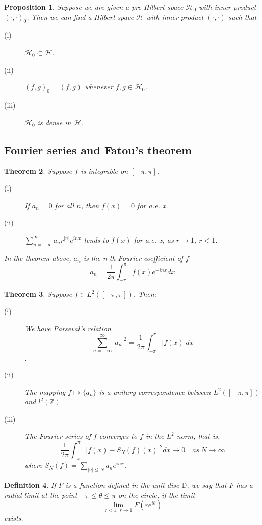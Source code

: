 \documentclass[11pt]{article}
\newtheorem{theorem}{Theorem}[subsection]
\newtheorem{definition}[theorem]{Definition}
\newtheorem{proposition}[theorem]{Proposition}
\begin{document}
\begin{proposition}
    Suppose we are given a pre-Hilbert space $\mathcal{H}_0$ with inner product $(\cdot,\cdot)_0$. Then we can find a Hilbert space $\mathcal{H}$ with inner product $(\cdot,\cdot)$ such that
    \begin{description}
        \item[(i)] $\mathcal{H}_0\subset \mathcal{H}$.
        \item[(ii)] $(f,g)_0=(f,g)$ whenever $f,g\in\mathcal{H}_0$.
        \item[(iii)] $\mathcal{H}_0 $ is dense in $\mathcal{H}$.
    \end{description}
\end{proposition}

\subsection{Fourier series and Fatou's theorem}
\begin{theorem}
    Suppose $f$ is integrable on $[-\pi,\pi]$.
    \begin{description}
        \item[(i)] If $a_n=0$ for all $n$, then $f(x)=0$ for a.e. x.
        \item[(ii)] $\sum_{n=-\infty}^\infty a_nr^{|n|}e^{inx}$ tends to $f(x)$ for a.e. x, as $r\to1 $, $r<1$.
    \end{description}
    In the theorem above, $a_n$ is the n-th Fourier coefficient of $f$
    \[a_n=\frac{1}{2\pi}\int_{-\pi}^{\pi}f(x)e^{-inx}dx\]
\end{theorem}
\begin{theorem}
    Suppose $f\in L^2([-\pi,\pi])$. Then:
    \begin{description}
        \item[(i)] We have Parseval's relation \[\sum_{n=-\infty}^\infty|a_n|^2=\frac{1}{2\pi}\int_{-\pi}^\pi |f(x)|dx\].
        \item[(ii)] The mapping $f\mapsto \{a_n\}$ is a unitary correspondence between $L^2([-\pi,\pi])$ and ${l}^2(\mathbb{Z})$.
        \item[(iii)] The Fourier series of $f$ converges to $f$ in the $L^2$-norm, that is,\[\frac{1}{2\pi}\int_{-\pi}^\pi|f(x)-S_N(f)(x)|^2dx\to 0\quad as\ N\to\infty\] where $S_N(f)=\sum_{|n|\leq N}a_ne^{inx}$.
    \end{description}
\end{theorem}

\begin{definition}
    If $F$ is a function defined in the unit disc $\mathbb{D}$, we say that $F$ has a radial limit at the point $-\pi\leq\theta\leq\pi$ on the circle, if the limit\[\lim_{r<1,\ r\to 1}F(re^{i\theta})\] exists.
\end{definition}
\end{document}
